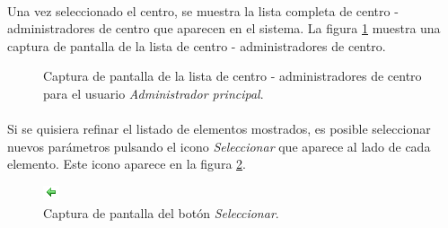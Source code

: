   \paragraph{}Una vez seleccionado el centro, se muestra la lista completa de
  centro - administradores de centro que aparecen en el sistema. La figura
  \ref{capturaPantallaListaCentroAdministradoresCentroAdminPrincipal} muestra
  una captura de pantalla de la lista de centro - administradores de centro.

  \begin{figure}[!ht]
    \begin{center}
      \caption{Captura de pantalla de la lista de centro - administradores de centro para el usuario \textit{Administrador principal}.}
      \label{capturaPantallaListaCentroAdministradoresCentroAdminPrincipal}
    \end{center}
  \end{figure}

  \paragraph{}Si se quisiera refinar el listado de elementos mostrados, es
  posible seleccionar nuevos parámetros pulsando el icono \textit{Seleccionar}
  que aparece al lado de cada elemento. Este icono aparece en la figura
  \ref{capturaBotonSeleccionar}.

  \begin{figure}[!ht]
    \begin{center}
      \includegraphics[scale=0.55]{4.Funcionamiento_Aplicacion/4.3.Gestion/4.3.1.Administrador_Principal/4.3.1.1.Introduccion/botonSeleccionar.png}
      \caption{Captura de pantalla del botón \textit{Seleccionar}.}
      \label{capturaBotonSeleccionar}
    \end{center}
  \end{figure}
